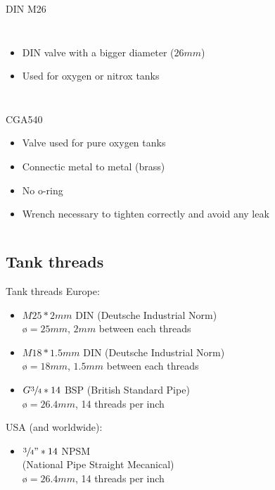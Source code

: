 \documentclass[aspectratio=1610,english,12pt]{beamer}
\begin{document}
\begin{frame}{DIN M26}
	\begin{columns}[onlytextwidth]
			\begin{itemize}
				\item DIN valve with a bigger diameter ($26mm$)
				\item Used for oxygen or nitrox tanks
			\end{itemize} 
	\end{columns}
\end{frame}

\begin{frame}{CGA540}
	\begin{itemize}
		\item Valve used for pure oxygen tanks
		\item Connectic metal to metal (brass)
		\item No o-ring
		\item Wrench necessary to tighten correctly and avoid any leak
	\end{itemize}
	\begin{columns}
	\end{columns}
\end{frame}

\subsection{Tank threads}

\begin{frame}{Tank threads}
	Europe:
	\begin{itemize}
		\item $M25*2mm$ DIN (Deutsche Industrial Norm)\\
			{\o}$=25mm$, $2mm$ between each threads\\
			\hfill
		\item $M18*1.5mm$ DIN (Deutsche Industrial Norm)\\
			{\o}$=18mm$, $1.5mm$ between each threads\\
			\hfill
		\item $G \sfrac{3}{4}*14$ BSP (British Standard Pipe)\\
			{\o}$=26.4mm$, 14 threads per inch\\
			\hfill
	\end{itemize}
	USA (and worldwide):
	\begin{itemize}
		\item $\sfrac{3}{4}"*14$ NPSM\\
			(National Pipe Straight Mecanical)\\
			{\o}$=26.4mm$, 14 threads per inch\\
			\hfill
	\end{itemize}
\end{frame}
\end{document}
